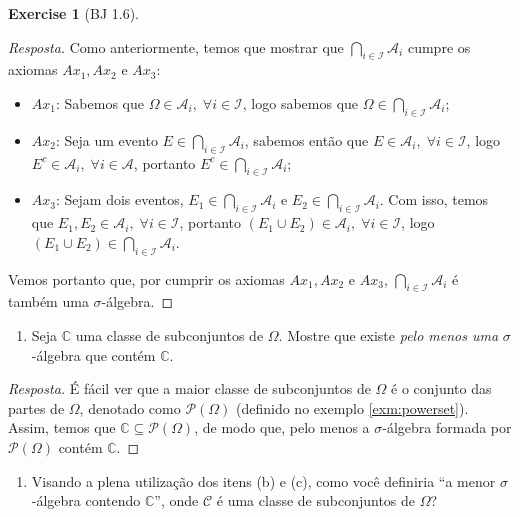 \documentclass[
]{article}
\providecommand{\tightlist}{%
  \setlength{\itemsep}{0pt}\setlength{\parskip}{0pt}}
\theoremstyle{definition}
\theoremstyle{definition}
\theoremstyle{definition}
\newtheorem{exercise}{Exercise}[section]
\theoremstyle{definition}
\theoremstyle{remark}
\begin{document}
\begin{exercise}[BJ 1.6]
\begin{proof}[Resposta]
Como anteriormente, temos que mostrar que \(\bigcap_{i \in \mathcal{I}}\mathcal{A}_{i}\) cumpre os axiomas \(Ax_{1}, Ax_{2}\) e \(Ax_{3}\):

\begin{itemize}
\tightlist
\item
  \(Ax_{1}\): Sabemos que \(\Omega \in \mathcal{A}_{i}, \; \forall i \in \mathcal{I}\), logo sabemos que \(\Omega \in \bigcap_{i \in \mathcal{I}}\mathcal{A}_{i}\);
\item
  \(Ax_{2}\): Seja um evento \(E \in \bigcap_{i \in \mathcal{I}}\mathcal{A}_{i}\), sabemos então que \(E \in \mathcal{A}_{i}, \; \forall i \in \mathcal{I}\), logo \(E^{c} \in \mathcal{A}_{i}, \; \forall i \in \mathcal{A}\), portanto \(E^{c} \in \bigcap_{i \in \mathcal{I}}\mathcal{A}_{i}\);
\item
  \(Ax_{3}\): Sejam dois eventos, \(E_{1} \in \bigcap_{i \in \mathcal{I}}\mathcal{A}_{i}\) e \(E_{2} \in \bigcap_{i \in \mathcal{I}}\mathcal{A}_{i}\). Com isso, temos que \(E_{1}, E_{2} \in \mathcal{A}_{i}, \; \forall i \in \mathcal{I}\), portanto \((E_{1} \cup E_{2}) \in \mathcal{A}_{i}, \; \forall i \in \mathcal{I}\), logo \((E_{1} \cup E_{2}) \in \bigcap_{i \in \mathcal{I}}\mathcal{A}_{i}\).
\end{itemize}

Vemos portanto que, por cumprir os axiomas \(Ax_{1}, Ax_{2}\) e \(Ax_{3}\), \(\bigcap_{i \in \mathcal{I}}\mathcal{A}_{i}\) é também uma \(\sigma\)-álgebra.
\end{proof}

\begin{enumerate}
\def\labelenumi{\alph{enumi})}
\setcounter{enumi}{2}
\tightlist
\item
  Seja \(\mathbb{C}\) uma classe de subconjuntos de \(\Omega\). Mostre que existe \emph{pelo menos uma} \(\sigma\)-álgebra que contém \(\mathbb{C}\).
\end{enumerate}

\begin{proof}[Resposta]
É fácil ver que a maior classe de subconjuntos de \(\Omega\) é o conjunto das partes de \(\Omega\), denotado como \(\mathcal{P}(\Omega)\) (definido no exemplo \ref{exm:powerset}). Assim, temos que \(\mathbb{C} \subseteq \mathcal{P}(\Omega)\), de modo que, pelo menos a \(\sigma\)-álgebra formada por \(\mathcal{P}(\Omega)\) contém \(\mathbb{C}\).
\end{proof}

\begin{enumerate}
\def\labelenumi{\alph{enumi})}
\setcounter{enumi}{3}
\tightlist
\item
  Visando a plena utilização dos itens (b) e (c), como você definiria ``a menor \(\sigma\)-álgebra contendo \(\mathbb{C}\)'', onde \(\mathcal{C}\) é uma classe de subconjuntos de \(\Omega\)?
\end{enumerate}


\end{exercise}
\end{document}
